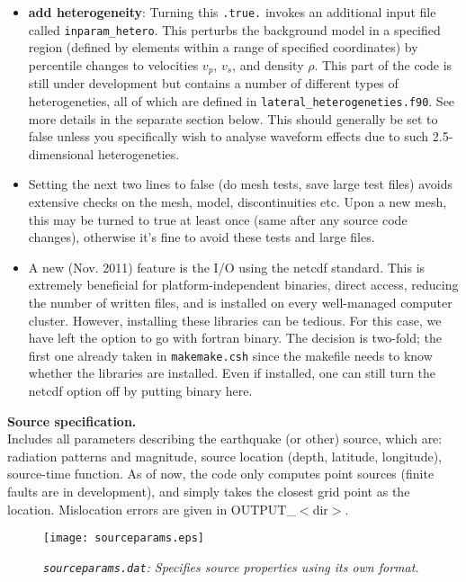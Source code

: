 \documentclass[11pt,letter,fleqn,english,notitlepage]{article}
\begin{document}
\begin{itemize}
\item \textbf{add heterogeneity}: Turning this {\tt .true.} invokes an additional input file called {\tt inparam\_hetero}. 
This perturbs the background model in a specified region (defined by elements within a range of specified coordinates) 
by percentile changes to velocities $v_p$, $v_s$, and density
$\rho$. This part of the code is still under development but contains
a number of different types of heterogeneties, all of which are
defined in {\tt lateral\_heterogeneties.f90}. See more details in the separate section below. 
This should generally be set to false unless you specifically wish to analyse waveform effects due to such 
2.5-dimensional heterogeneties. 

\item Setting the next two lines to false (do mesh tests, save large test files) 
avoids extensive checks on the mesh, model, discontinuities etc. Upon a new mesh, this may be turned 
to true at least once (same after any source code changes), otherwise
it's fine to avoid these tests and large files.

\item A new (Nov. 2011) feature is the I/O using the netcdf
  standard. This is extremely beneficial for platform-independent
  binaries, direct access, reducing the number of written files, and
  is installed on every well-managed computer cluster. However,
  installing these libraries can be tedious. For this case, we have
  left the option to go with fortran binary. The decision is two-fold;
  the first one already taken in {\tt makemake.csh} since the makefile needs to
  know whether the libraries are installed. Even if installed, one can
  still turn the netcdf option off by putting binary here. 
\end{itemize}

\noindent \textbf{Source specification.}\\
Includes all parameters describing the earthquake (or other) source, which are: 
radiation patterns and magnitude, source location (depth, latitude, longitude), source-time function.
As of now, the code only computes point sources (finite faults are in development), 
and simply takes the closest grid point as the location. Mislocation errors are given in OUTPUT\_$<$dir$>$.\\

\begin{figure*}[htb]
\begin{center}
\texttt{[image: sourceparams.eps]}
\caption{\textit{{\tt sourceparams.dat}: Specifies source properties using its own format.}}
\end{center}
\end{figure*}
\end{document}
